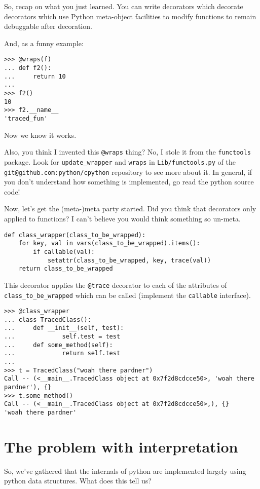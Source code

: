 \documentclass[11pt]{article}
\begin{document}
So, recap on what you just learned. You can write decorators which
decorate decorators which use Python meta-object facilities to
modify functions to remain debuggable after decoration.

And, as a funny example:
\begin{verbatim}
>>> @wraps(f)
... def f2():
...     return 10
... 
>>> f2()
10
>>> f2.__name__
'traced_fun'
\end{verbatim}
Now we know it works.

Also, you think I invented this \texttt{@wraps} thing? No, I stole it from the
\texttt{functools} package. Look for \texttt{update\_wrapper} and \texttt{wraps} in
\texttt{Lib/functools.py} of the \texttt{git@github.com:python/cpython} repository
to see more about it. In general, if you don't understand how
something is implemented, go read the python source code!

Now, let's get the (meta-)meta party started.  Did you think that
decorators only applied to functions? I can't believe you would
think something so un-meta.
\begin{verbatim}
def class_wrapper(class_to_be_wrapped):
    for key, val in vars(class_to_be_wrapped).items():
        if callable(val):
            setattr(class_to_be_wrapped, key, trace(val))
    return class_to_be_wrapped
\end{verbatim}
This decorator applies the \texttt{@trace} decorator to each of the
attributes of \texttt{class\_to\_be\_wrapped} which can be called (implement
the \texttt{callable} interface).
\begin{verbatim}
>>> @class_wrapper
... class TracedClass():
...     def __init__(self, test):
...             self.test = test
...     def some_method(self):
...             return self.test
... 
>>> t = TracedClass("woah there pardner")
Call -- (<__main__.TracedClass object at 0x7f2d8cdcce50>, 'woah there pardner'), {}
>>> t.some_method()
Call -- (<__main__.TracedClass object at 0x7f2d8cdcce50>,), {}
'woah there pardner'
\end{verbatim}

\section{The problem with interpretation}
\label{sec:org4d898dd}
So, we've gathered that the internals of python are implemented
largely using python data structures. What does this tell us?
\end{document}

